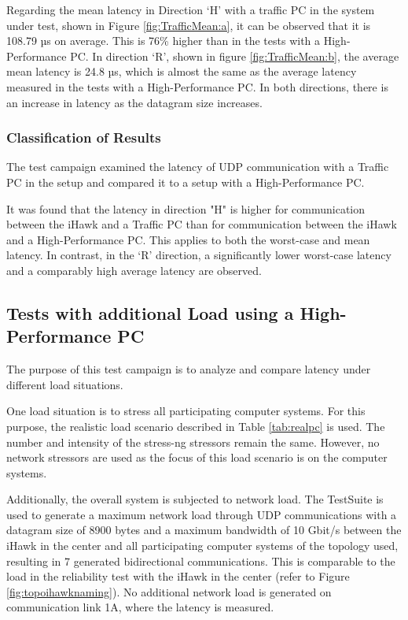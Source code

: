 Regarding the mean latency in Direction `H' with a traffic PC in the system under test, shown in Figure \ref{fig:TrafficMean:a}, it can be observed that it is 108.79 µs on average. This is 76\% higher than in the tests with a High-Performance PC. In direction `R', shown in figure \ref{fig:TrafficMean:b}, the average mean latency is 24.8 µs, which is almost the same as the average latency measured in the tests with a High-Performance PC. In both directions, there is an increase in latency as the datagram size increases.

\subsubsection{Classification of Results}
The test campaign examined the latency of UDP communication with a Traffic PC in the setup and compared it to a setup with a High-Performance PC.

It was found that the latency in direction "H" is higher for communication between the iHawk and a Traffic PC than for communication between the iHawk and a High-Performance PC. This applies to both the worst-case and mean latency. In contrast, in the `R' direction, a significantly lower worst-case latency and a comparably high average latency are observed.


\subsection{Tests with additional Load using a High-Performance PC}
The purpose of this test campaign is to analyze and compare latency under different load situations.

One load situation is to stress all participating computer systems. For this purpose, the realistic load scenario described in Table \ref{tab:realpc} is used. The number and intensity of the stress-ng stressors remain the same. However, no network stressors are used as the focus of this load scenario is on the computer systems.

Additionally, the overall system is subjected to network load. The TestSuite is used to generate a maximum network load through UDP communications with a datagram size of 8900 bytes and a maximum bandwidth of 10 Gbit/s between the iHawk in the center and all participating computer systems of the topology used, resulting in 7 generated bidirectional communications. This is comparable to the load in the reliability test with the iHawk in the center (refer to Figure \ref{fig:topoihawknaming}). No additional network load is generated on communication link 1A, where the latency is measured.

